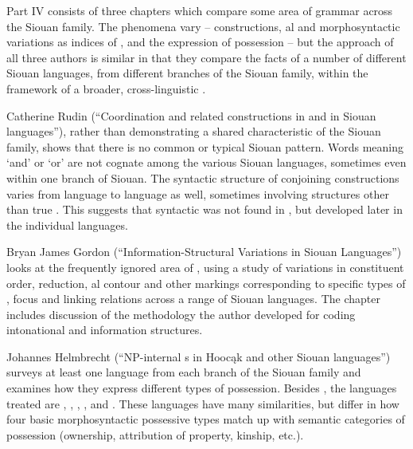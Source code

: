 \begin{refsection}

Part IV consists of three chapters which compare some area of grammar across the Siouan family. The phenomena vary --  constructions, al and morphosyntactic variations as indices of , and the expression of possession -- but the approach of all three authors is similar in that they compare the facts of a number of different Siouan languages, from different branches of the Siouan family, within the framework of a broader, cross-linguistic .

Catherine Rudin (``Coordination and related constructions in  and in Siouan languages''), rather than demonstrating a shared characteristic of the Siouan family, shows that there is no common or typical Siouan  pattern. Words meaning `and' or `or' are not cognate among the various Siouan languages, sometimes even within one branch of Siouan. The syntactic structure of conjoining constructions varies from language to language as well, sometimes involving structures other than true . This suggests that syntactic  was not found in , but developed later in the individual languages.

Bryan James Gordon (``Information-Structural Variations in Siouan Languages'') looks at the frequently ignored area of , using a  study of variations in constituent order, reduction, al contour and other markings corresponding to specific types of , focus and linking relations across a range of Siouan languages. The chapter includes discussion of the methodology the author developed for coding intonational and information structures.


Johannes Helmbrecht (``NP-internal s in Hooc\k{a}k and other Siouan languages'') surveys at least one language from each branch of the Siouan family and examines how they express different types of possession. Besides , the languages treated are , , , ,  and . These languages have many similarities, but differ in how four basic morphosyntactic possessive types match up with semantic categories of possession (ownership, attribution of property, kinship, etc.).


 
\end{refsection}

